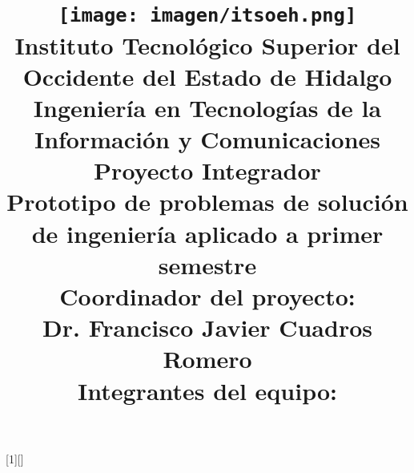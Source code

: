 \documentclass[conference]{IEEEtran}
\begin{document}
[1][]
{}
{}

\title{\texttt{[image: imagen/itsoeh.png]}\\ \vspace*{0.2cm} {\large Instituto Tecnológico Superior del Occidente del Estado de Hidalgo} \\
  \vspace*{0.2cm}
  \large Ingeniería en Tecnologías de la Información y Comunicaciones  \\  
  \vspace*{0.5cm}  
  {\huge Proyecto Integrador} \\
  {\normalsize Prototipo de problemas de solución de ingeniería aplicado a primer semestre}\\
  {\vspace{1cm} \large \textbf{Coordinador del proyecto:}\\ Dr. Francisco Javier Cuadros Romero}\\
  \vspace{1cm}
  {\large \textbf{Integrantes del equipo:}}
  \vspace{0.5cm}
  }
  
\end{document}
